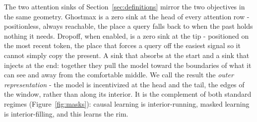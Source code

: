 \paperFramingExtrapolation

The two attention sinks of Section~\ref{sec:definitions} mirror the two objectives in the same geometry. Ghostmax is a zero sink at the head of every attention row - positionless, always reachable, the place a query falls back to when the past holds nothing it needs. Dropoff, when enabled, is a zero sink at the tip - positioned on the most recent token, the place that forces a query off the easiest signal so it cannot simply copy the present. A sink that absorbs at the start and a sink that injects at the end: together they pull the model toward the boundaries of what it can see and away from the comfortable middle. We call the result the \textit{outer representation} - the model is incentivized at the head and the tail, the edges of the window, rather than along its interior. It is the complement of both standard regimes (Figure~\ref{fig:masks}): causal learning is interior-running, masked learning is interior-filling, and this learns the rim.

